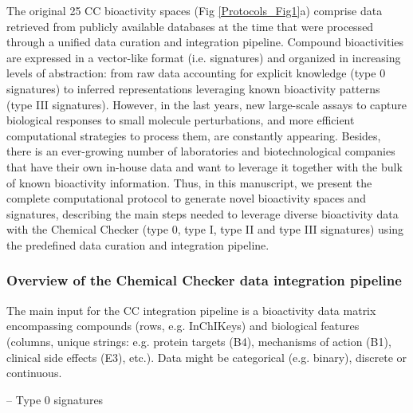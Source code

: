 The original 25 CC bioactivity spaces (Fig \ref{Protocols_Fig1}a) comprise data retrieved from publicly available databases at the time that were processed through a unified data curation and integration pipeline. Compound bioactivities are expressed in a vector-like format (i.e. signatures) and organized in increasing levels of abstraction: from raw data accounting for explicit knowledge (type 0 signatures) to inferred representations leveraging known bioactivity patterns (type III signatures). However, in the last years, new large-scale assays to capture biological responses to small molecule perturbations, and more efficient computational strategies to process them, are constantly appearing\cite{anglada-girotto_combining_2022, mitchell_proteome-wide_2023, offensperger_large-scale_2024}. Besides, there is an ever-growing number of laboratories and biotechnological companies that have their own in-house data and want to leverage it together with the bulk of known bioactivity information. Thus, in this manuscript, we present the complete computational protocol to generate novel bioactivity spaces and signatures, describing the main steps needed to leverage diverse bioactivity data with the Chemical Checker (type 0, type I, type II and type III signatures) using the predefined data curation and integration pipeline.

\subsubsection{Overview of the Chemical Checker data integration pipeline}

The main input for the CC integration pipeline is a bioactivity data matrix encompassing compounds (rows, e.g. InChIKeys) and biological features (columns, unique strings: e.g. protein targets (B4), mechanisms of action (B1), clinical side effects (E3), etc.). Data might be categorical (e.g. binary), discrete or continuous.

-- Type 0 signatures